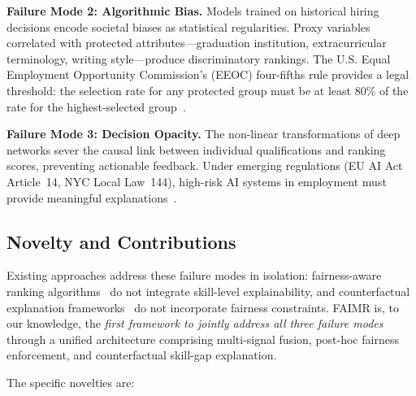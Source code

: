 \documentclass[smallcondensed,numbers]{sn-jnl}
\begin{document}
\textbf{Failure Mode 2: Algorithmic Bias.} Models trained on historical hiring decisions encode societal biases as statistical regularities. Proxy variables correlated with protected attributes---graduation institution, extracurricular terminology, writing style---produce discriminatory rankings. The U.S. Equal Employment Opportunity Commission's (EEOC) four-fifths rule provides a legal threshold: the selection rate for any protected group must be at least 80\% of the rate for the highest-selected group~\cite{dwork2012fairness,buolamwini2018gender}.

\textbf{Failure Mode 3: Decision Opacity.} The non-linear transformations of deep networks sever the causal link between individual qualifications and ranking scores, preventing actionable feedback. Under emerging regulations (EU AI Act Article~14, NYC Local Law~144), high-risk AI systems in employment must provide meaningful explanations~\cite{wachter2017counterfactual}.

\subsection{Novelty and Contributions}

Existing approaches address these failure modes in isolation: fairness-aware ranking algorithms~\cite{zehlike2017fa} do not integrate skill-level explainability, and counterfactual explanation frameworks~\cite{mothilal2020dice} do not incorporate fairness constraints. FAIMR is, to our knowledge, the \textit{first framework to jointly address all three failure modes} through a unified architecture comprising multi-signal fusion, post-hoc fairness enforcement, and counterfactual skill-gap explanation.

The specific novelties are:
\end{document}
